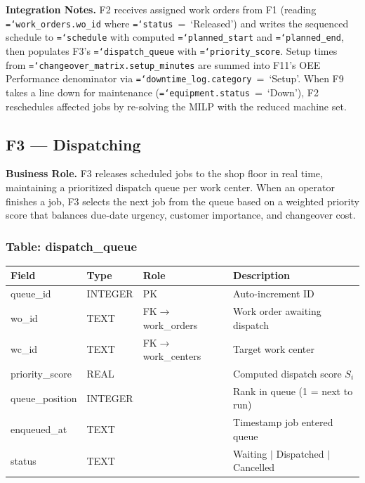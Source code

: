 \documentclass[11pt]{article}
\newcommand{\tfield}[1]{\texttt{\hyphenchar\font=`\-\relax #1}}
\begin{document}
\textbf{Integration Notes.}
F2 receives assigned work orders from F1 (reading \tfield{work\_orders.wo\_id} where \tfield{status}~=~`Released') and writes the sequenced schedule to \tfield{schedule} with computed \tfield{planned\_start} and \tfield{planned\_end}, then populates F3's \tfield{dispatch\_queue} with \tfield{priority\_score}.  Setup times from \tfield{changeover\_matrix.setup\_minutes} are summed into F11's OEE Performance denominator via \tfield{downtime\_log.category}~=~`Setup'.  When F9 takes a line down for maintenance (\tfield{equipment.status}~=~`Down'), F2 reschedules affected jobs by re-solving the MILP with the reduced machine set.

\subsection{F3 --- Dispatching}

\textbf{Business Role.}
F3 releases scheduled jobs to the shop floor in real time, maintaining a prioritized dispatch queue per work center.  When an operator finishes a job, F3 selects the next job from the queue based on a weighted priority score that balances due-date urgency, customer importance, and changeover cost.

\subsubsection*{Table: dispatch\_queue}
\begin{table}[H]\centering\small
\begin{tabular}{@{} l l l L{5.5cm} @{}}
\toprule
\textbf{Field} & \textbf{Type} & \textbf{Role} & \textbf{Description} \\
\midrule
queue\_id      & INTEGER & PK  & Auto-increment ID \\
wo\_id         & TEXT    & FK$\to$work\_orders & Work order awaiting dispatch \\
wc\_id         & TEXT    & FK$\to$work\_centers & Target work center \\
priority\_score & REAL   &     & Computed dispatch score $S_i$ \\
queue\_position & INTEGER &    & Rank in queue (1 = next to run) \\
enqueued\_at   & TEXT    &     & Timestamp job entered queue \\
status         & TEXT    &     & Waiting $\mid$ Dispatched $\mid$ Cancelled \\
\bottomrule
\end{tabular}
\end{table}
\end{document}

